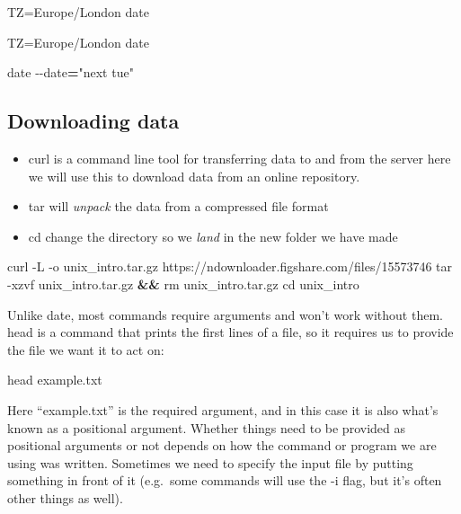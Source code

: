 \documentclass[
]{book}
\newenvironment{Shaded}{\begin{snugshade}}{\end{snugshade}}
\newcommand{\AttributeTok}[1]{\textcolor[rgb]{0.77,0.63,0.00}{#1}}
\newcommand{\BuiltInTok}[1]{#1}
\newcommand{\ExtensionTok}[1]{#1}
\newcommand{\FunctionTok}[1]{\textcolor[rgb]{0.00,0.00,0.00}{#1}}
\newcommand{\KeywordTok}[1]{\textcolor[rgb]{0.13,0.29,0.53}{\textbf{#1}}}
\newcommand{\NormalTok}[1]{#1}
\newcommand{\OperatorTok}[1]{\textcolor[rgb]{0.81,0.36,0.00}{\textbf{#1}}}
\newcommand{\StringTok}[1]{\textcolor[rgb]{0.31,0.60,0.02}{#1}}
\newcommand{\VariableTok}[1]{\textcolor[rgb]{0.00,0.00,0.00}{#1}}
\begin{document}
\begin{Shaded}
\begin{Highlighting}[]
    \VariableTok{TZ=}\NormalTok{Europe/London }\FunctionTok{date}

    \VariableTok{TZ=}\NormalTok{Europe/London }\FunctionTok{date}

    \FunctionTok{date} \AttributeTok{{-}{-}date}\OperatorTok{=}\StringTok{"next tue"}
\end{Highlighting}
\end{Shaded}

\hypertarget{downloading-data}{%
\subsection{Downloading data}\label{downloading-data}}

\begin{itemize}
\item
  curl is a command line tool for transferring data to and from the server here we will use this to download data from an online repository.
\item
  tar will \emph{unpack} the data from a compressed file format
\item
  cd change the directory so we \emph{land} in the new folder we have made
\end{itemize}

\begin{Shaded}
\begin{Highlighting}[]
    \ExtensionTok{curl} \AttributeTok{{-}L} \AttributeTok{{-}o}\NormalTok{ unix\_intro.tar.gz https://ndownloader.figshare.com/files/15573746}
    \FunctionTok{tar} \AttributeTok{{-}xzvf}\NormalTok{ unix\_intro.tar.gz }\KeywordTok{\&\&} \FunctionTok{rm}\NormalTok{ unix\_intro.tar.gz}
    \BuiltInTok{cd}\NormalTok{ unix\_intro}
\end{Highlighting}
\end{Shaded}

Unlike date, most commands require arguments and won't work without them. head is a command that prints the first lines of a file, so it requires us to provide the file we want it to act on:

\begin{Shaded}
\begin{Highlighting}[]
    \FunctionTok{head}\NormalTok{ example.txt}
\end{Highlighting}
\end{Shaded}

Here ``example.txt'' is the required argument, and in this case it is also what's known as a positional argument. Whether things need to be provided as positional arguments or not depends on how the command or program we are using was written. Sometimes we need to specify the input file by putting something in front of it (e.g.~some commands will use the -i flag, but it's often other things as well).
\end{document}
